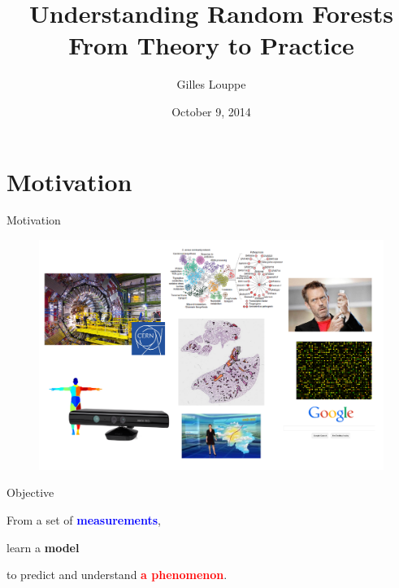 \documentclass{beamer}
\title{{\bf Understanding Random Forests}\\
From Theory to Practice}
\author{Gilles Louppe}
\institute{Université de Liège, Belgium}
\date{October 9, 2014}
\newcommand{\X}[1]{\textcolor{blue}{#1}}
\newcommand{\y}[1]{\textcolor{red}{#1}}
\newcommand{\model}[1]{\textcolor{mygreen}{#1}}
\begin{document}

\begin{frame}
\titlepage
\end{frame}





\section{Motivation}

\begin{frame}{Motivation}

\begin{figure}
\vspace{-0.5cm}
\includegraphics[scale=0.4]{./figures/motivation.png}
\end{figure}

\end{frame}

\begin{frame}{Objective}

\begin{center}
From a set of {\bf \X{measurements}},

\vspace{1cm}
learn a {\bf \model{model}}
\vspace{1cm}

to predict and understand {\bf \y{a phenomenon}}.
\end{center}

\end{frame}
\end{document}
